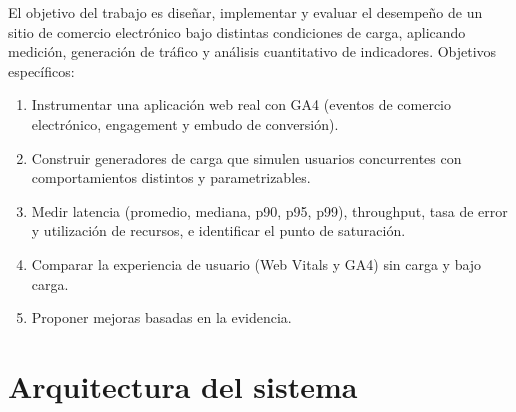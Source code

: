 \documentclass[11pt,a4paper]{article}
\begin{document}
El objetivo del trabajo es diseñar, implementar y evaluar el desempeño de un
sitio de comercio electrónico bajo distintas condiciones de carga, aplicando
medición, generación de tráfico y análisis cuantitativo de indicadores.
Objetivos específicos:
\begin{enumerate}
  \item Instrumentar una aplicación web real con GA4 (eventos de comercio
        electrónico, engagement y embudo de conversión).
  \item Construir generadores de carga que simulen usuarios concurrentes con
        comportamientos distintos y parametrizables.
  \item Medir latencia (promedio, mediana, p90, p95, p99), throughput, tasa de
        error y utilización de recursos, e identificar el punto de saturación.
  \item Comparar la experiencia de usuario (Web Vitals y GA4) sin carga y bajo carga.
  \item Proponer mejoras basadas en la evidencia.
\end{enumerate}

\Needspace{0.5\textheight}
\section{Arquitectura del sistema}
\end{document}
